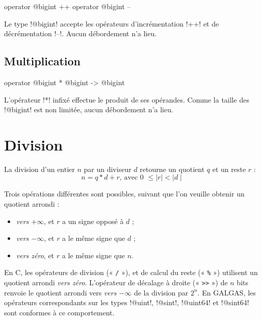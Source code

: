 \begin{galgas3box}
operator @bigint ++
operator @bigint --
\end{galgas3box}

Le type \ggst!@bigint! accepte les opérateurs d'incrémentation \ggst!++! et de décrémentation \ggst!--!. Aucun débordement n'a lieu.

\subsection{Multiplication}

\begin{galgas3box}
operator @bigint * @bigint -> @bigint
\end{galgas3box}

L'opérateur \ggst!*! infixé effectue le produit de ses opérandes. Comme la taille des \ggst!@bigint! est non limitée, aucun débordement n'a lieu.




\section{Division}



La division d'un entier $n$ par un diviseur $d$ retourne un quotient $q$ et un reste $r$ :
\begin{equation*}
n = q * d + r\text{, avec 0 } \leqslant \mid r\mid < \mid d\mid
\end{equation*}

Trois opérations différentes sont possibles, suivant que l'on veuille obtenir un quotient arrondi :
\begin{itemize}
\item \emph{vers $+\infty$}, et $r$ a un signe opposé à $d$ ;
\item \emph{vers $-\infty$}, et $r$ a le même signe que $d$ ;
\item \emph{vers zéro}, et $r$ a le même signe que $n$.
\end{itemize}

En C, les opérateurs de division (« \texttt{/} »), et de calcul du reste (« \texttt{\%} ») utilisent un quotient arrondi \emph{vers zéro}. L'opérateur de décalage à droite (« \texttt{>{}>} ») de $n$ bits renvoie le quotient arrondi vers \emph{vers $-\infty$} de la division par $2^n$. En GALGAS, les opérateurs correspondants sur les types \ggst!@uint!, \ggst!@sint!, \ggst!@uint64! et \ggst!@sint64! sont conformes à ce comportement.

